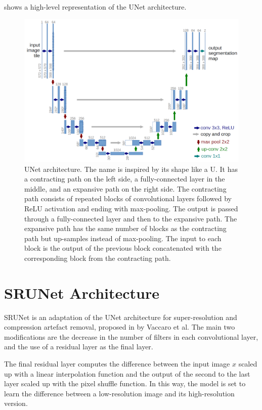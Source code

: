  shows a high-level representation of the UNet architecture.

\begin{figure}[ht]
\centering
\includegraphics[width=1.0\textwidth]{static/unet_architecture.png}
\caption{UNet architecture. The name is inspired by its shape like a U. It has a contracting path on the left side, a fully-connected layer in the middle, and an expansive path on the right side. The contracting path consists of repeated blocks of convolutional layers followed by ReLU activation and ending with max-pooling. The output is passed through a fully-connected layer and then to the expansive path. The expansive path has the same number of blocks as the contracting path but up-samples instead of max-pooling. The input to each block is the output of the previous block concatenated with the corresponding block from the contracting path.}
\label{fig:unet}
\end{figure}

\section{SRUNet Architecture}
\label{sec:srunet}

SRUNet is an adaptation of the UNet architecture for super-resolution and compression artefact removal, proposed in \cite{vaccaro2021fast} by Vaccaro et al. The main two modifications are the decrease in the number of filters in each convolutional layer, and the use of a residual layer as the final layer.

The final residual layer computes the difference between the input image $x$ scaled up with a linear interpolation function and the output of the second to the last layer scaled up with the pixel shuffle function. In this way, the model is set to learn the difference between a low-resolution image and its high-resolution version.

